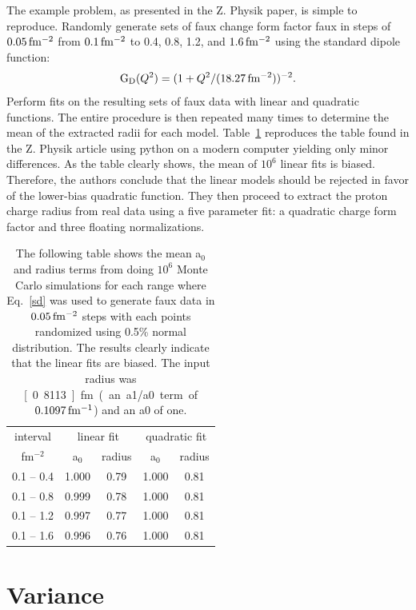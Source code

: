 \documentclass[10pt,aps,prc,twocolumn]{revtex4-1}
\begin{document}
The example problem, as presented in the Z. Physik paper, is simple to reproduce.   
Randomly generate sets of faux change form factor faux in steps of $\unit[0.05]{fm^{-2}}$ from $\unit[0.1]{fm^{-2}}$ to 0.4, 0.8, 1.2,
and $\unit[1.6]{fm^{-2}}$ using the standard dipole function:
\begin{equation}
\label{sd}
\mathrm{G_D}(Q^2) = ( 1 + Q^2/(\unit[18.27]{fm^{-2}}))^{-2}.
\end{equation}
Perform fits on the resulting sets of faux data with linear and quadratic functions. The entire procedure is
then repeated many times to determine the mean of the extracted radii for each model. Table~\ref{ztable} reproduces the table found in the
Z. Physik article using python on a modern computer yielding only minor differences.
As the table clearly shows, the mean of $10^6$ linear fits is biased. 
Therefore, the authors conclude that the linear models should be rejected in favor of the lower-bias quadratic function.
They then proceed to extract the proton charge radius from real data using a five parameter fit: a quadratic charge form factor and three floating normalizations.

\begin{table}
\label{ztable}
\caption{The following table shows the mean a$_0$ and radius terms from doing $10^6$ Monte Carlo simulations
for each range
where Eq.~\ref{sd} was used to generate faux data in $\unit[0.05]{fm^{-2}}$ steps with each points randomized using
0.5\% normal distribution.   The results clearly indicate that the linear fits are biased.   The input
radius was \unit[0.8113]{fm} (an a1/a0 term of $\unit[0.1097]{fm^{-1}}$) and an a0 of one.}
\begin{tabular}{c|cc|cc} \hline
interval       & \multicolumn{2}{c|}{linear fit} & \multicolumn{2}{c}{quadratic fit}  \\
fm$^{-2}$      & a$_0$      & radius          & a$_0$    & radius \\ \hline
 0.1 -- 0.4 & 1.000& 0.79& 1.000& 0.81 \\
 0.1 -- 0.8 & 0.999& 0.78& 1.000& 0.81 \\
 0.1 -- 1.2 & 0.997& 0.77& 1.000& 0.81 \\
 0.1 -- 1.6 & 0.996& 0.76& 1.000& 0.81 \\ \hline
\end{tabular}
\end{table}

\section{Variance}
\end{document}
